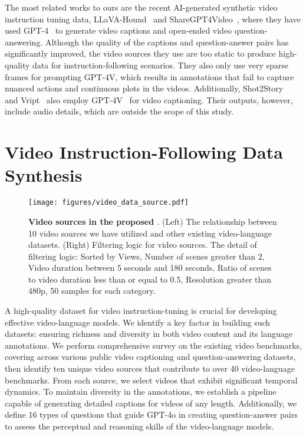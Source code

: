 The most related works to ours are the recent AI-generated synthetic video instruction tuning data, LLaVA-Hound~\citep{zhang2024direct} and ShareGPT4Video~\citep{chen2024sharegpt4video}, where they have used GPT-4~\citep{openai2023gpt4v} to generate video captions and open-ended video question-answering. Although the quality of the captions and question-answer pairs has significantly improved, the video sources they use are too static to produce high-quality data for instruction-following scenarios. They also only use very sparse frames for prompting GPT-4V, which results in annotations that fail to capture nuanced actions and continuous plots in the videos. Additionally, Shot2Story~\citep{han2023shot2story20k} and Vript~\citep{han2023shot2story20k} also employ GPT-4V~\citep{openai2023gpt4v} for video captioning. Their outputs, however, include audio details, which are outside the scope of this study.

\section{Video Instruction-Following Data Synthesis}
\label{sec:dataset}

\begin{figure}[t!]
    \centering
    \texttt{[image: figures/video\_data\_source.pdf]}

    \caption{\textbf{Video sources in the proposed \textit{\DataName{}}}. (Left) The relationship between 10 video sources we have utilized and other existing video-language datasets. (Right) Filtering logic for video sources. The detail of filtering logic:  Sorted by Views,  Number of scenes greater than 2,  Video duration between 5 seconds and 180 seconds,  Ratio of scenes to video duration less than or equal to 0.5,  Resolution greater than 480p,  50 samples for each category.}
\label{fig:video_data_source}
\end{figure}

A high-quality dataset for video instruction-tuning is crucial for developing effective video-language models. We identify a key factor in building such datasets: ensuring richness and diversity in both video content and its language annotations. We perform comprehensive survey on the existing video benchmarks, covering across various public video captioning and question-answering datasets, then identify ten unique video sources that contribute to over 40 video-language benchmarks. From each source, we select videos that exhibit significant temporal dynamics. To maintain diversity in the annotations, we establish a pipeline capable of generating detailed captions for videos of any length. Additionally, we define 16 types of questions that guide GPT-4o in creating question-answer pairs to assess the perceptual and reasoning skills of the video-language models.

